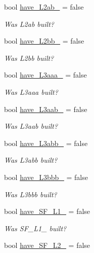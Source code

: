 \begin{DoxyCompactItemize}
bool \mbox{\hyperlink{classforte_1_1_r_d_ms_ac18177564e1c68ad4af6ae2b621c2348}{have\+\_\+\+L2ab\+\_\+}} = false
\begin{DoxyCompactList}\small\item\em Was L2ab built? \end{DoxyCompactList}\item 
bool \mbox{\hyperlink{classforte_1_1_r_d_ms_a05ea335cbdcdcda00943acb85677f0ad}{have\+\_\+\+L2bb\+\_\+}} = false
\begin{DoxyCompactList}\small\item\em Was L2bb built? \end{DoxyCompactList}\item 
bool \mbox{\hyperlink{classforte_1_1_r_d_ms_a0bcb1ccc87a150448d6fae1e79354ed4}{have\+\_\+\+L3aaa\+\_\+}} = false
\begin{DoxyCompactList}\small\item\em Was L3aaa built? \end{DoxyCompactList}\item 
bool \mbox{\hyperlink{classforte_1_1_r_d_ms_a651a2a38f4d0d6218366ab95e2a1f120}{have\+\_\+\+L3aab\+\_\+}} = false
\begin{DoxyCompactList}\small\item\em Was L3aab built? \end{DoxyCompactList}\item 
bool \mbox{\hyperlink{classforte_1_1_r_d_ms_acec3a86c1d43368d431eb23b442b4ccb}{have\+\_\+\+L3abb\+\_\+}} = false
\begin{DoxyCompactList}\small\item\em Was L3abb built? \end{DoxyCompactList}\item 
bool \mbox{\hyperlink{classforte_1_1_r_d_ms_ae4af2d63e004c9f6cab2e6b4ba62ceed}{have\+\_\+\+L3bbb\+\_\+}} = false
\begin{DoxyCompactList}\small\item\em Was L3bbb built? \end{DoxyCompactList}\item 
bool \mbox{\hyperlink{classforte_1_1_r_d_ms_a531174d4085e6c5eb221c77c40c01c3f}{have\+\_\+\+S\+F\+\_\+\+L1\+\_\+}} = false
\begin{DoxyCompactList}\small\item\em Was S\+F\+\_\+\+L1\+\_\+ built? \end{DoxyCompactList}\item 
bool \mbox{\hyperlink{classforte_1_1_r_d_ms_a87658c82f2376ee9d140449a03e2d166}{have\+\_\+\+S\+F\+\_\+\+L2\+\_\+}} = false

\end{DoxyCompactItemize}

